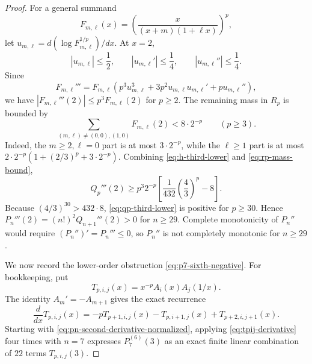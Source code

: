 \documentclass[11pt]{article}
\numberwithin{equation}{section}
\theoremstyle{definition}
\theoremstyle{remark}
\newcommand{\1}{\mathbf 1}
\begin{document}
\begin{proof}
For a general summand
\begin{equation}
\label{eq:fmell-general}
F_{m,\ell}(x)=
\left(\frac{x}{(x+m)(1+\ell x)}\right)^p,
\end{equation}
let \(u_{m,\ell}=d(\log F_{m,\ell}^{1/p})/dx\).  At \(x=2\),
\begin{equation}
\label{eq:umell-bounds}
|u_{m,\ell}|\le\frac12,\qquad
|u_{m,\ell}'|\le\frac14,\qquad
|u_{m,\ell}''|\le\frac14.
\end{equation}
Since
\begin{equation}
\label{eq:fmell-third-log}
F_{m,\ell}'''=F_{m,\ell}\left(p^3u_{m,\ell}^3+3p^2u_{m,\ell}u_{m,\ell}'+pu_{m,\ell}''\right),
\end{equation}
we have \(|F_{m,\ell}'''(2)|\le p^3F_{m,\ell}(2)\) for \(p\ge2\).  The remaining mass in \(R_p\) is bounded by
\begin{equation}
\label{eq:rp-mass-bound}
\sum_{(m,\ell)\ne(0,0),(1,0)}F_{m,\ell}(2)<8\cdot2^{-p}
\qquad(p\ge3).
\end{equation}
Indeed, the \(m\ge2,\ell=0\) part is at most \(3\cdot2^{-p}\), while the \(\ell\ge1\) part is at most \(2\cdot2^{-p}(1+(2/3)^p+3\cdot2^{-p})\).
Combining \eqref{eq:h-third-lower} and \eqref{eq:rp-mass-bound},
\begin{equation}
\label{eq:qp-third-lower}
Q_p'''(2)\ge
p^3 2^{-p}
\left[
\frac1{432}\left(\frac43\right)^p-8
\right].
\end{equation}
Because \((4/3)^{30}>432\cdot8\), \eqref{eq:qp-third-lower} is positive for \(p\ge30\).  Hence \(P_n'''(2)=(n!)^2Q_{n+1}'''(2)>0\) for \(n\ge29\).  Complete monotonicity of \(P_n''\) would require \((P_n'')'=P_n'''\le0\), so \(P_n''\) is not completely monotonic for \(n\ge29\).

We now record the lower-order obstruction \eqref{eq:p7-sixth-negative}.  For bookkeeping, put
\begin{equation}
\label{eq:tpij-definition}
T_{p,i,j}(x)=x^{-p}A_i(x)A_j(1/x).
\end{equation}
The identity \(A_m'=-A_{m+1}\) gives the exact recurrence
\begin{equation}
\label{eq:tpij-derivative}
\frac{d}{dx}T_{p,i,j}(x)
=-pT_{p+1,i,j}(x)-T_{p,i+1,j}(x)+T_{p+2,i,j+1}(x).
\end{equation}
Starting with \eqref{eq:pn-second-derivative-normalized}, applying \eqref{eq:tpij-derivative} four times with \(n=7\) expresses \(P_7^{(6)}(3)\) as an exact finite linear combination of \(22\) terms \(T_{p,i,j}(3)\).


\end{proof}
\end{document}
